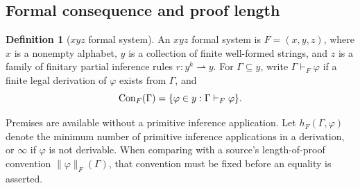 \documentclass[11pt,letterpaper]{article}
\theoremstyle{definition}\newtheorem{definition}[theorem]{Definition}\newtheorem{example}[theorem]{Example}\newtheorem{protocol}[theorem]{Protocol}\newtheorem{question}[theorem]{Open Problem}
\theoremstyle{remark}\newtheorem{remark}[theorem]{Remark}
\begin{document}
\subsection{Formal consequence and proof length}
\begin{definition}[$xyz$ formal system]
An $xyz$ formal system is $F=(x,y,z)$, where $x$ is a nonempty alphabet, $y$ is a collection of finite well-formed strings, and $z$ is a family of finitary partial inference rules $r:y^k\rightharpoonup y$. For $\Gamma\subseteq y$, write $\Gamma\vdash_F\varphi$ if a finite legal derivation of $\varphi$ exists from $\Gamma$, and
\[
\operatorname{Con}_F(\Gamma)=\{\varphi\in y:\Gamma\vdash_F\varphi\}.
\]
\end{definition}
Premises are available without a primitive inference application. Let $h_F(\Gamma,\varphi)$ denote the minimum number of primitive inference applications in a derivation, or $\infty$ if $\varphi$ is not derivable. When comparing with a source's length-of-proof convention $\|\varphi\|_F(\Gamma)$, that convention must be fixed before an equality is asserted.
\end{document}

